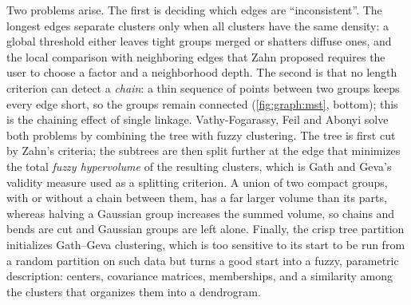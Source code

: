 Two problems arise. The first is deciding which edges are ``inconsistent''. The longest edges separate clusters only when all clusters have the same density: a global threshold either leaves tight groups merged or shatters diffuse ones, and the local comparison with neighboring edges that Zahn proposed requires the user to choose a factor and a neighborhood depth. The second is that no length criterion can detect a \emph{chain}: a thin sequence of points between two groups keeps every edge short, so the groups remain connected (\cref{fig:graph:mst}, bottom); this is the chaining effect of single linkage. Vathy-Fogarassy, Feil and Abonyi \cite{vathy:2005:mst} solve both problems by combining the tree with fuzzy clustering. The tree is first cut by Zahn's criteria; the subtrees are then split further at the edge that minimizes the total \emph{fuzzy hypervolume} of the resulting clusters, which is Gath and Geva's validity measure \cite{gath:1989} used as a splitting criterion. A union of two compact groups, with or without a chain between them, has a far larger volume than its parts, whereas halving a Gaussian group increases the summed volume, so chains and bends are cut and Gaussian groups are left alone. Finally, the crisp tree partition initializes Gath--Geva clustering, which is too sensitive to its start to be run from a random partition on such data but turns a good start into a fuzzy, parametric description: centers, covariance matrices, memberships, and a similarity among the clusters that organizes them into a dendrogram.

